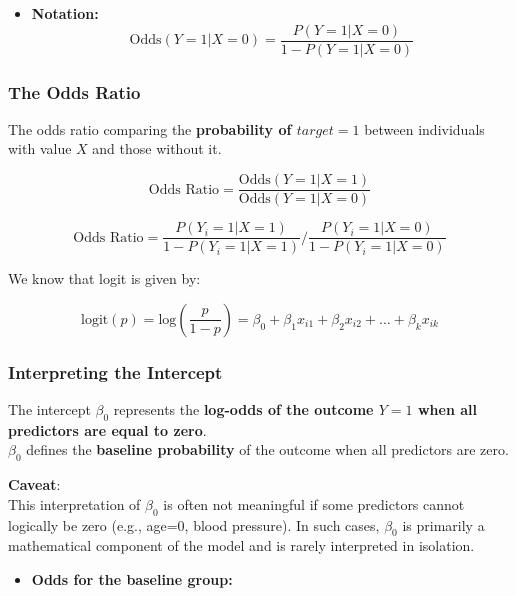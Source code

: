 \documentclass{article}
\providecommand{\tightlist}{%
  \setlength{\itemsep}{0pt}\setlength{\parskip}{0pt}}
\begin{document}
\begin{itemize}
\tightlist
\item
  \textbf{Notation:}
  \[\text{Odds}(Y=1|X=0)=\dfrac{P(Y=1|X=0)}{1-P(Y=1|X=0)}\]
\end{itemize}

\subsubsection{\texorpdfstring{\textbf{The Odds
Ratio}}{The Odds Ratio}}\label{the-odds-ratio}

The odds ratio comparing the \textbf{probability of \(target=1\)}
between individuals with value \(X\) and those without it.

\[\text{Odds Ratio} = \dfrac{\text{Odds}(Y=1|X=1)}{\text{Odds}(Y=1|X=0)}\]

\[\text{Odds Ratio} = \dfrac{P(Y_i=1 | X=1)}{1 - P(Y_i=1 | X=1)} / \dfrac{P(Y_i=1 | X=0)}{1 - P(Y_i=1 | X=0)}\]

We know that logit is given by:

\[\text{logit}(p) = \text{log}(\dfrac{p}{1-p}) = \beta_0 + \beta_1 x_{i1} + \beta_2 x_{i2} + \ldots + \beta_k x_{ik}\]

\subsubsection{\texorpdfstring{\textbf{Interpreting the
Intercept}}{Interpreting the Intercept}}\label{interpreting-the-intercept}

The intercept \(\beta_0\)\hspace{0pt} represents the \textbf{log-odds of
the outcome \(Y=1\) when all predictors are equal to zero}.\\
\(\beta_0\)\hspace{0pt} defines the \textbf{baseline probability} of the
outcome when all predictors are zero.

\textbf{Caveat}:\\
This interpretation of \(\beta_0\) is often not meaningful if some
predictors cannot logically be zero (e.g., age=0, blood pressure). In
such cases, \(\beta_0\)\hspace{0pt} is primarily a mathematical
component of the model and is rarely interpreted in isolation.

\begin{itemize}
\tightlist
\item
  \textbf{Odds for the baseline group:}
\end{itemize}
\end{document}
